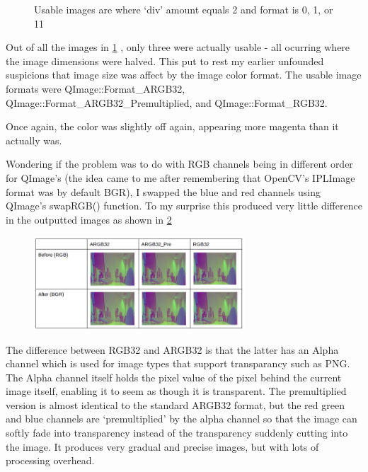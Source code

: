 \documentclass[11pt]{article} %
\begin{document}
{{\begin{figure}
\begin{center}
	\end{center}
	\vspace{-20pt}
	\caption{Usable images are where ‘div’ amount equals 2 and format is 0, 1, or 11}
	\label{fig:shell2}
\end{figure}
Out of all the images in \cref{fig:shell2} , only three were actually usable - all ocurring where the image dimensions were halved. This put to rest my earlier unfounded suspicions that image size was affect by the image color format. The usable image formats were QImage::Format\_ARGB32, QImage::Format\_ARGB32\_Premultiplied, and QImage::Format\_RGB32.

Once again, the color was slightly off again, appearing more magenta than it actually was.

Wondering if the problem was to do with RGB channels being in different order for QImage’s (the idea came to me after remembering that OpenCV’s IPLImage format was by default BGR), I swapped the blue and red channels using QImage’s swapRGB() function. To my surprise this produced very little difference in the outputted images as shown in \cref{fig:swaprgb}
\begin{figure}
	\begin{center}
		\includegraphics[width=0.7\textwidth]{../images/qpix/swaprgb}
	\end{center}
	\vspace{-20pt}
	\caption{}
	\label{fig:swaprgb}
\end{figure}

 The difference between RGB32 and ARGB32 is that the latter has an Alpha channel which is used for image types that support transparancy such as PNG. The Alpha channel itself holds the pixel value of the pixel behind the current image itself, enabling it to seem as though it is transparent.  The premultiplied version is almost identical to the standard ARGB32 format, but the red green and blue channels are ‘premultiplied’ by the alpha channel so that the image can softly fade into transparency instead of the transparency suddenly cutting into the image. It produces very gradual and precise images, but with lots of processing overhead.

}}
\end{document}
